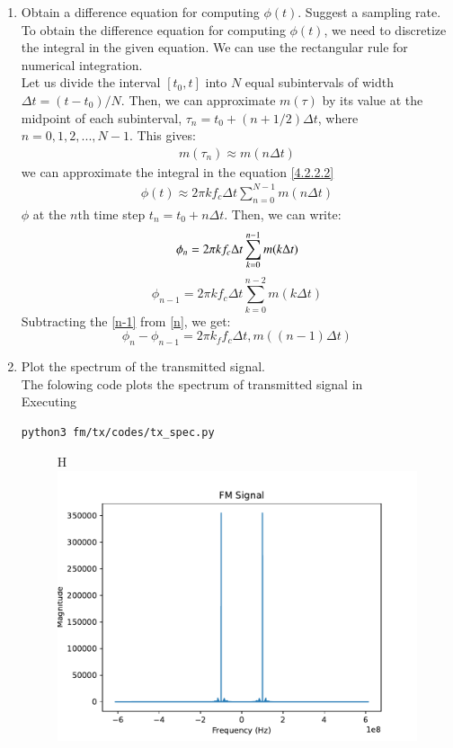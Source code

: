 \begin{enumerate}[label=\arabic*.,ref=\thesection.\theenumi]
\item Obtain a difference equation for computing $\phi(t)$.  Suggest a sampling rate.
\\
\solution 
\quad To obtain the difference equation for computing $\phi(t)$, we need to discretize the integral in the given equation. We can use the rectangular rule for numerical integration.\\ 
Let us divide the interval $[t_0, t]$ into $N$ equal subintervals of width $\Delta t = (t - t_0)/N$. Then, we can approximate $m(\tau)$ by its value at the midpoint of each subinterval, $\tau_n = t_0 + (n + 1/2)\Delta t$, where $n = 0, 1, 2, ..., N-1$. This gives:
\begin{align*}
m(\tau_n) \approx m(n\Delta t)
\end{align*}
we can approximate the integral in the equation \ref{4.2.2.2}
\\
\begin{align*}
\phi(t) \approx 2\pi kf_c \Delta t \sum_{n=0}^{N-1} m(n\Delta t)
\end{align*}
$\phi$ at the $n$th time step $t_n = t_0 + n\Delta t$. Then, we can write:
\begin{equation}
\label{n}
\phi_n = 2\pi kf_c \Delta t \sum_{k=0}^{n-1} m(k\Delta t) \\
\end{equation}
\begin{equation}
\label{n-1}
\phi_{n-1} = 2\pi kf_c \Delta t \sum_{k=0}^{n-2} m(k\Delta t)
\end{equation}
Subtracting the \ref{n-1} from \ref{n}, we get:
\begin{equation}
\phi_n - \phi_{n-1} = 2\pi k_f f_c \Delta t, m((n-1)\Delta t)
\end{equation}
\item Plot the spectrum of the transmitted signal.
\\
\solution
The folowing code plots the spectrum of transmitted signal in 
\\
Executing
\begin{lstlisting}
python3 fm/tx/codes/tx_spec.py
\end{lstlisting}
\begin{figure}{H}
\centering	
\includegraphics[width=\columnwidth]{fm/tx/figs/tx_spec.pdf} 

\end{figure}
\end{enumerate}
